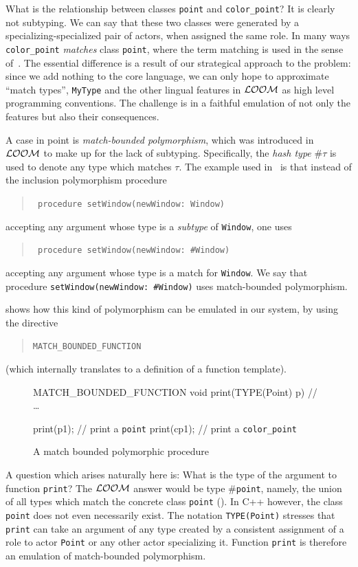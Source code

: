 \documentclass[11pt]{article}
\numberwithin{figure}{section}
\newcommand\CC{\Lang{\mbox{C++}}\xspace}
\newcommand\Lang[1]{\textsc{#1}}
\newcommand{\cd}[1]{\texttt{#1}}
\newcommand{\LOOM}{\ensuremath{\cal{LOOM}}\xspace}
\begin{document}
What is the relationship between classes \cd{point} and
    \cd{color\_point}?
It is clearly not subtyping.
We can say that these two classes were generated
    by a specializing-specialized pair of actors,
    when assigned the same role.
In many ways \cd{color\_point} \emph{matches}
    class \cd{point}, where the term matching is used
    in the sense of~\cite{Bruce:Fiech:Peteresen:97}.
The essential difference is a result of our strategical approach to the problem:
    since we add nothing to the core language, we can only hope to approximate
    ``match types'', \cd{MyType} and the other lingual features
    in \LOOM as high level programming conventions.
The challenge is in a faithful emulation of not only the features
    but also their consequences.

A case in point is \emph{match-bounded polymorphism},
    which was introduced in \LOOM to make
    up for the lack of subtyping.
Specifically,  the \emph{hash type} $\#\tau$ is
    used to denote any type which matches $\tau$.
The example used in~\cite{Bruce:Fiech:Peteresen:97} is
    that instead of the inclusion polymorphism procedure
\begin{quote}\tt
    procedure setWindow(newWindow: Window)
\end{quote}
accepting any argument whose type is a \emph{subtype} of
    \texttt{Window},
one uses
\begin{quote}\tt
    procedure setWindow(newWindow: \#Window)
\end{quote}
accepting any argument whose type is a match for \cd{Window}.
We say that procedure \texttt{setWindow(newWindow: \#Window)}
    uses match-bounded polymorphism.

 shows how
    this kind of polymorphism can be emulated
    in our system, by using
    the directive \begin{quote}
        \cd{MATCH\_BOUNDED\_FUNCTION}
    \end{quote}
        (which internally translates to a definition
    of a function template).


\begin{figure}[!htb]
\CPP
MATCH_BOUNDED_FUNCTION
void print(TYPE(Point) p) {
        //{} \ldots
}


print(p1);    //{} print a \cd{point}
print(cp1);   //{} print a \cd{color\_point}
\END\PROGbf{}
\caption{A match bounded polymorphic procedure}
\label{Figure:method}
\end{figure}

A question which arises naturally here is: What is the type
    of the argument to function \cd{print}?
The \LOOM answer would be type \#\cd{point},
    namely, the union of all types which match the concrete class
    \cd{point} ().
In \CC{} however, the class \cd{point} does not even necessarily
    exist.
The notation \texttt{TYPE(Point)}
    stresses that \cd{print} can take an argument of
    any type created by a consistent assignment
    of a role to actor \cd{Point} or any other actor
    specializing it.
Function \cd{print} is therefore an emulation of
    match-bounded polymorphism.
\end{document}
